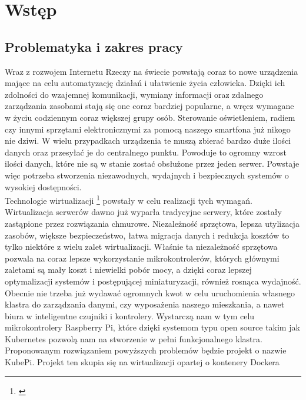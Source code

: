 \documentclass[12pt]{report}
\let\Oldsection\section
\renewcommand{\section}{\FloatBarrier\Oldsection}
\begin{document}


\tableofcontents    %

\chapter{Wstęp}\label{chap:wstep}
\section{Problematyka i zakres pracy}
Wraz z rozwojem Internetu Rzeczy na świecie powstają coraz to nowe urządzenia mające na celu automatyzację działań i ułatwienie życia człowieka. Dzięki ich zdolności do wzajemnej komunikacji, wymiany informacji oraz zdalnego zarządzania zasobami stają się one coraz bardziej popularne, a wręcz wymagane w życiu codziennym coraz większej grupy osób. Sterowanie oświetleniem, radiem czy innymi sprzętami elektronicznymi za pomocą naszego smartfona już nikogo nie dziwi. W wielu przypadkach urządzenia te muszą zbierać bardzo duże ilości danych oraz przesyłać je do centralnego punktu. Powoduje to ogromny wzrost ilości danych, które nie są w stanie zostać obsłużone przez jeden serwer. Powstaje więc potrzeba stworzenia niezawodnych, wydajnych i bezpiecznych systemów o wysokiej dostępności. \\
\indent Technologie wirtualizacji
\footnote{\cite{virtualization}}
powstały w celu realizacji tych wymagań. Wirtualizacja serwerów dawno już wyparła tradycyjne serwery, które zostały zastąpione przez rozwiązania chmurowe. Niezależność sprzętowa, lepsza utylizacja zasobów, większe bezpieczeństwo, łatwa migracja danych i redukcja kosztów to tylko niektóre z wielu zalet wirtualizacji. Właśnie ta niezależność sprzętowa pozwala na coraz lepsze wykorzystanie mikrokontrolerów, których głównymi zaletami są mały koszt i niewielki pobór mocy, a dzięki coraz lepszej optymalizacji systemów i postępującej miniaturyzacji, również rosnąca wydajność. \\
	\indent Obecnie nie trzeba już wydawać ogromnych kwot w celu uruchomienia własnego klastra do zarządzania danymi, czy wyposażenia naszego mieszkania, a nawet biura w inteligentne czujniki i kontrolery. Wystarczą nam w tym celu mikrokontrolery Raspberry Pi, które dzięki systemom typu open source takim jak Kubernetes pozwolą nam na stworzenie w pełni funkcjonalnego klastra. \\
	\indent Proponowanym rozwiązaniem powyższych problemów będzie projekt o nazwie KubePi. Projekt ten skupia się na wirtualizacji opartej o kontenery Dockera
\end{document}
